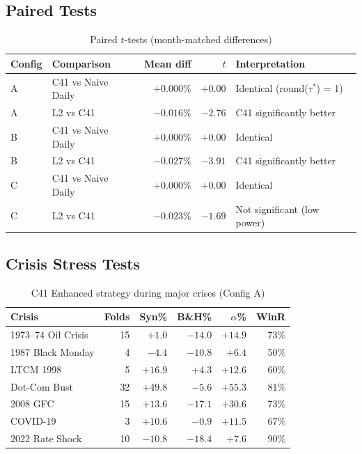 \documentclass[11pt,a4paper]{article}
\begin{document}
\subsection{Paired Tests}

\begin{table}[H]
\centering
\caption{Paired $t$-tests (month-matched differences)}
\label{tab:paired}
\begin{tabular}{llrrl}
\toprule
Config & Comparison & Mean diff & $t$ & Interpretation \\
\midrule
A & C41 vs Naive Daily & $+0.000\%$ & $+0.00$ & Identical (round($\tau^*$) = 1) \\
A & L2 vs C41 & $-0.016\%$ & $-2.76$ & C41 significantly better \\
B & C41 vs Naive Daily & $+0.000\%$ & $+0.00$ & Identical \\
B & L2 vs C41 & $-0.027\%$ & $-3.91$ & C41 significantly better \\
C & C41 vs Naive Daily & $+0.000\%$ & $+0.00$ & Identical \\
C & L2 vs C41 & $-0.023\%$ & $-1.69$ & Not significant (low power) \\
\bottomrule
\end{tabular}
\end{table}

\subsection{Crisis Stress Tests}

\begin{table}[H]
\centering
\caption{C41 Enhanced strategy during major crises (Config A)}
\label{tab:crises}
\begin{tabular}{lrrrrr}
\toprule
Crisis & Folds & Syn\% & B\&H\% & $\alpha$\% & WinR \\
\midrule
1973--74 Oil Crisis & 15 & $+1.0$ & $-14.0$ & $+14.9$ & 73\% \\
1987 Black Monday & 4 & $-4.4$ & $-10.8$ & $+6.4$ & 50\% \\
LTCM 1998 & 5 & $+16.9$ & $+4.3$ & $+12.6$ & 60\% \\
Dot-Com Bust & 32 & $+49.8$ & $-5.6$ & $+55.3$ & 81\% \\
2008 GFC & 15 & $+13.6$ & $-17.1$ & $+30.6$ & 73\% \\
COVID-19 & 3 & $+10.6$ & $-0.9$ & $+11.5$ & 67\% \\
2022 Rate Shock & 10 & $-10.8$ & $-18.4$ & $+7.6$ & 90\% \\
\bottomrule
\end{tabular}
\end{table}
\end{document}
